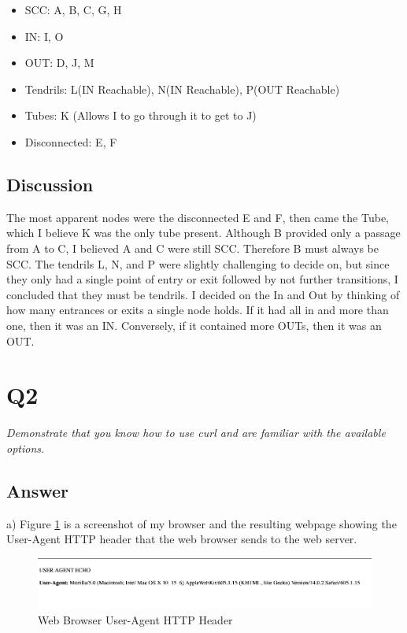 \documentclass[12pt]{article}
\begin{document}
\begin{itemize}
  \item SCC: A, B, C, G, H
  \item IN: I, O
  \item OUT: D, J, M
  \item Tendrils: L(IN Reachable), N(IN Reachable), P(OUT Reachable)
  \item Tubes: K (Allows I to go through it to get to J)
  \item Disconnected: E, F
\end{itemize}

\subsection*{Discussion}
The most apparent nodes were the disconnected E and F, then came the Tube, which I believe K was the only tube present. Although B provided only a passage from A to C, I believed A and C were still SCC. Therefore B must always be SCC. The tendrils L, N, and P were slightly challenging to decide on, but since they only had a single point of entry or exit followed by not further transitions, I concluded that they must be tendrils.  I decided on the In and Out by thinking of how many entrances or exits a single node holds. If it had all in and more than one, then it was an IN. Conversely, if it contained more OUTs, then it was an OUT.

\section*{Q2}
\emph{Demonstrate that you know how to use curl and are familiar with the available options.}


\subsection*{Answer}
a) Figure \ref{fig:q2a} is a screenshot of my browser and the resulting webpage showing the User-Agent HTTP header that the web browser sends to the web server.

\begin{figure}[h!]
    \centering
    \includegraphics[clip, width=\textwidth] {a}
    \caption{Web Browser User-Agent HTTP Header}
    \label{fig:q2a}
\end{figure}
\end{document}
